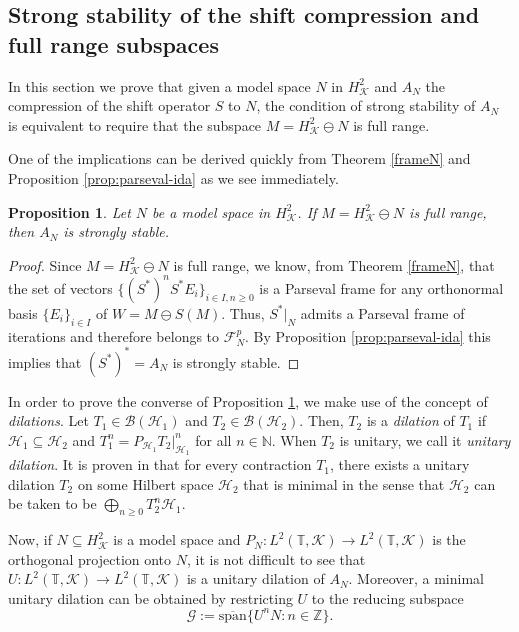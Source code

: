 \documentclass[a4paper,12pt]{amsart}
\def\cF{{\mathcal{F}}}
\def\HH{{\mathcal{H}}}
\def\KK{{\mathcal{K}}}
\def\cF{{\mathcal{F}}}
\def\T{{\mathbb{T}}}
\def\Z{{\mathbb{Z}}}
\def\osp{{\overline{\textrm{span}}}}
\newtheorem{proposition}[theorem]{Proposition}
\theoremstyle{definition}
\begin{document}
\subsection{Strong stability of the shift compression and full range subspaces}

In this section we prove that given a model space $N$ in $H^{2}_{\KK}$ and $A_{N}$ the compression of the shift operator $S$ to $N$, the condition of strong stability of $A_{N}$ is equivalent to require that the subspace $M=H^2_\KK\ominus N$ is full range.

One of the implications can be derived quickly from Theorem \ref{frameN} and Proposition \ref{prop:parseval-ida} as we see immediately.

\begin{proposition}\label{Nfullrange->ANstrongstable} Let $N$ be a model space in $H^{2}_\KK$. If $M=H^2_{\KK}\ominus N$ is full range, then $A_N$ is strongly stable.
\end{proposition}
\begin{proof}
Since $M=H^2_{\KK}\ominus N$ is full range, we know, from Theorem \ref{frameN}, that the set of vectors $\{(S^*)^nS^*E_i\}_{i\in I, n\geqslant0}$ is a Parseval frame for any orthonormal basis $\{E_i\}_{i\in I}$ of $W=M\ominus S(M)$. Thus, $S^*|_N$ admits a Parseval frame of iterations and therefore belongs to $\cF^p_N$. By Proposition \ref{prop:parseval-ida} this implies that $(S^*)^*=A_N$ is strongly stable.
\end{proof}


In order to prove the converse of Proposition \ref{Nfullrange->ANstrongstable}, we make use of the concept of {\em dilations}.
Let $T_1\in\mathcal B(\HH_1)$ and $T_2\in\mathcal B(\HH_2)$. Then, $T_2$ is a {\em dilation} of $T_1$ if $\HH_1\subseteq\HH_2$ and 
$T_{1}^n=P_{\HH_1}T_{2}|_{\HH_1}^n$ for all $n\in \mathbb N$. 
When $T_{2}$ is unitary, we call it {\em unitary dilation}. It is proven in \cite[I, $\S4$, Theorem 4.2]{NFBK10} that for every contraction $T_{1}$, there exists a unitary dilation $T_{2}$ on some Hilbert space $\HH_2$ that is minimal in the sense that $\HH_2$ can be taken to be $\bigoplus_{n\geq0} T_{2}^n\HH_1$.


Now, if $N\subseteq H^2_\KK$ is a model space and $P_N:L^2(\T,\KK)\to L^2(\T,\KK)$ is the orthogonal projection onto $N$, 
it is not difficult to see that $U:L^2(\T,\KK)\to L^2(\T,\KK)$ is a unitary dilation of $A_N$. Moreover, a minimal unitary dilation can be obtained by restricting $U$ to the reducing subspace
\begin{equation*}
\mathcal{G}:=\osp\{U^nN:n\in\Z\}.
\end{equation*}
\end{document}
